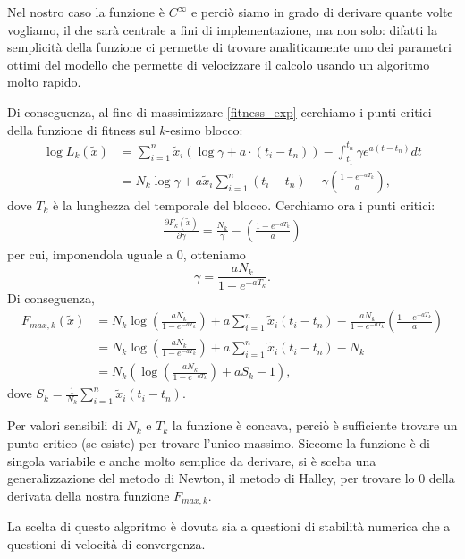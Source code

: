 \documentclass[10pt,a4paper]{report}
\begin{document}
Nel nostro caso la funzione è $C^{\infty}$ e perciò siamo in grado di derivare quante volte vogliamo, il che sarà centrale a fini di implementazione, ma non solo: difatti la semplicità della funzione ci permette di trovare analiticamente uno dei parametri ottimi del modello che permette di velocizzare il calcolo usando un algoritmo molto rapido.

Di conseguenza, al fine di massimizzare \eqref{fitness_exp} cerchiamo i punti critici della funzione di fitness sul $k$-esimo blocco:
\begin{align*}
\log L_k(\tilde{x}) &= \sum_{i=1}^n\tilde{x}_i(\log\gamma + a\cdot(t_i-t_n)) -\int_{t_1}^{t_n}\gamma e^{a(t-t_n)} dt\\
&=N_k\log\gamma + a\tilde{x}_i\sum_{i=1}^n(t_i-t_n)-\gamma\left(\frac{1-e^{-aT_k}}{a}\right),
\end{align*}
dove $T_k$ è la lunghezza del temporale del blocco. Cerchiamo ora i punti critici:
\begin{align*}
\frac{\partial F_k(\tilde{x})}{\partial \gamma} = \frac{N_k}{\gamma} - \left(\frac{1-e^{-aT_k}}{a}\right)
\end{align*}
per cui, imponendola uguale a $0$, otteniamo 
$$
\gamma = \frac{aN_k}{1-e^{-aT_k}}.
$$
Di conseguenza,
\begin{align}\nonumber
F_{max,k}(\tilde{x}) &= N_k\log\left(\frac{aN_k}{1-e^{-aT_k}}\right) + a\sum_{i=1}^n\tilde{x}_i(t_i-t_n)-\frac{aN_k}{1-e^{-aT_k}}\left(\frac{1-e^{-aT_k}}{a}\right)\\ \nonumber
&= N_k\log\left(\frac{aN_k}{1-e^{-aT_k}}\right) + a\sum_{i=1}^n\tilde{x}_i(t_i-t_n)-N_k\\
&= N_k\left(\log\left(\frac{aN_k}{1-e^{-aT_k}}\right) + aS_k-1\right),\label{our_loglikel}
\end{align}
dove $S_k = \frac{1}{N_k}\sum_{i=1}^n\tilde{x}_i(t_i-t_n)$. 

Per valori sensibili di $N_k$ e $T_k$ la funzione è concava, perciò è sufficiente trovare un punto critico (se esiste) per trovare l'unico massimo. Siccome la funzione è di singola variabile e anche molto semplice da derivare, si è scelta una generalizzazione del metodo di Newton, il metodo di Halley, per trovare lo $0$ della derivata della nostra funzione $F_{max,k}$.

La scelta di questo algoritmo è dovuta sia a questioni di stabilità numerica che a questioni di velocità di convergenza.
\end{document}
